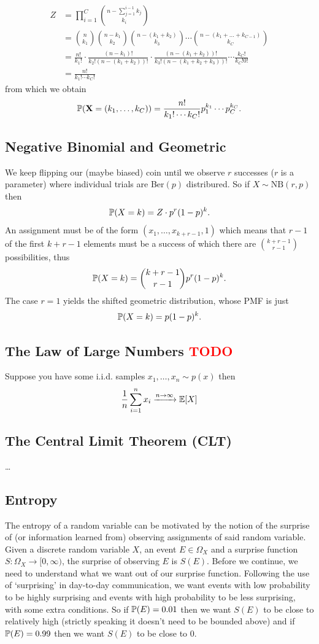 \documentclass[11pt]{article}
\begin{document}
\begin{appendices}
\begin{align*}
    Z
    &=
    \prod_{i=1}^C\binom{n-\sum_{j=1}^{i-1}k_j}{k_i}\\
    &=
    \binom{n}{k_1}\binom{n-k_1}{k_2}\binom{n-(k_1+k_2)}{k_3}\cdots\binom{n-(k_1+\dots+k_{C-1})}{k_C}\\
    &=
    \frac{n!}{k_1!}\cdot\frac{(n-k_1)!}{k_2!(n-(k_1+k_2))!}\cdot\frac{(n-(k_1+k_2))!}{k_3!(n-(k_1+k_2+k_3))!}\cdots\frac{k_C!}{k_C!0!}\\
    &=
    \frac{n!}{k_1!\cdots k_C!}
\end{align*}
from which we obtain
$$
\P(\X=(k_1,\dots,k_C))
=
\frac{n!}{k_1!\cdots k_C!}p_1^{k_1}\cdots p_C^{k_C}.
$$

\subsection{Negative Binomial and Geometric}
We keep flipping our (maybe biased) coin until we observe $r$ successes ($r$ is a parameter) where individual trials are Ber$(p)$ distribured. So if $X\sim\text{NB}(r,p)$ then
$$
\P(X=k)
=
Z\cdot p^r(1-p)^k.
$$
An assignment must be of the form $(x_1,\dots,x_{k+r-1},1)$ which means that $r-1$ of the first $k+r-1$ elements must be a success of which there are $\binom{k+r-1}{r-1}$ possibilities, thus
$$
\P(X=k)
=
\binom{k+r-1}{r-1}p^r(1-p)^k.
$$
The case $r=1$ yields the shifted geometric distribution, whose PMF is just
$$
\P(X=k)
=
p(1-p)^k.
$$

\subsection{The Law of Large Numbers \textcolor{red}{TODO}}
Suppose you have some i.i.d. samples $x_1,\dots,x_n\sim p(x)$ then
$$
\frac{1}{n}\sum_{i=1}^n x_i
\xrightarrow{n\to\infty}
\E[X]
$$

\subsection{The Central Limit Theorem (CLT)}
\dots

\subsection{Entropy}
\label{app:entropy}

The entropy of a random variable can be motivated by the notion of the surprise of (or information learned from) observing assignments of said random variable. Given a discrete random variable $X$, an event $E\in\Omega_X$ and a surprise function $S:\Omega_X\rightarrow[0,\infty)$, the surprise of observing $E$ is $S(E)$. Before we continue, we need to understand what we want out of our surprise function. Following the use of `surprising' in day-to-day communication, we want events with low probability to be highly surprising and events with high probability to be less surprising, with some extra conditions. So if $\P(E)=0.01$ then we want $S(E)$ to be close to relatively high (strictly speaking it doesn't need to be bounded above) and if $\P(E)=0.99$ then we want $S(E)$ to be close to 0.


\end{appendices}
\end{document}
